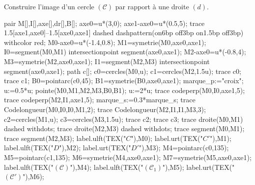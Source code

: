     \begin{methode*1}
        \exercice
        Construire l'image d'un cercle $(\mathcal{C})$ par rapport à une droite $(d)$.
        \correction
        \begin{minipage}{0.45\linewidth}
            \begin{center}
                \begin{Geometrie}[CoinHD={(6.5u,5.5u)},CoinBG={(0,-0.5u)}]
                    pair M[],I[],axe[],dr[],B[];
                    axe0=u*(3,0);
                    axe1-axe0=u*(0.5,5);                    
                    trace 1.5[axe1,axe0]--1.5[axe0,axe1] dashed dashpattern(on6bp off3bp on1.5bp off3bp) withcolor red;
                    M0-axe0=u*(-1.4,0.8);
                    M1=symetrie(M0,axe0,axe1);
                    I0=segment(M0,M1) intersectionpoint segment(axe0,axe1);
                    M2-axe0=u*(-0.8,4);
                    M3=symetrie(M2,axe0,axe1);
                    I1=segment(M2,M3) intersectionpoint segment(axe0,axe1);
                    path c[];
                    c0=cercles(M0,u);
                    c1=cercles(M2,1.5u);
                    trace c0;
                    trace c1;
                    B0=pointarc(c0,45);
                    B1=symetrie(B0,axe0,axe1);
                    marque_p:="croix";
                    u:=0.5*u;
                    pointe(M0,M1,M2,M3,B0,B1);
                    u:=2*u;
                    trace codeperp(M0,I0,axe1,5);
                    trace codeperp(M2,I1,axe1,5);
                    marque_s:=0.3*marque_s;
                    trace Codelongueur(M0,I0,I0,M1,2);
                    trace Codelongueur(M2,I1,I1,M3,3);
                    c2=cercles(M1,u);
                    c3=cercles(M3,1.5u);
                    trace c2;
                    trace c3;
                    trace droite(M0,M1) dashed withdots;
                    trace droite(M2,M3) dashed withdots;
                    trace segment(M0,M1);
                    trace segment(M2,M3);
                    label.ulft(TEX("$C$"),M0);
                    label.urt(TEX("$C'$"),M1);
                    label.ulft(TEX("$D$"),M2);
                    label.urt(TEX("$D'$"),M3);
                    M4=pointarc(c0,135);
                    M5=pointarc(c1,135);
                    M6=symetrie(M4,axe0,axe1);
                    M7=symetrie(M5,axe0,axe1);
                    label.ulft(TEX("$(\mathcal{C})$"),M4);
                    label.ulft(TEX("$(\mathcal{C_1})$"),M5);
                    label.urt(TEX("$(\mathcal{C}')$"),M6);

\end{Geometrie}
\end{center}
\end{minipage}
\end{methode*1}
